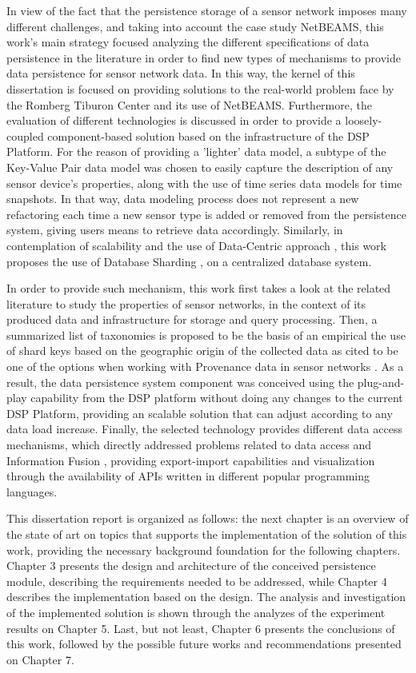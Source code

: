 In view of the fact that the persistence storage of a sensor network imposes
many different challenges, and taking into account the case study NetBEAMS, this
work's main strategy focused analyzing the different specifications of data
persistence in the literature in order to find new types of mechanisms to
provide data persistence for sensor network data. In this way, the kernel of
this dissertation is focused on providing solutions to the real-world problem
face by the Romberg Tiburon Center and its use of NetBEAMS. Furthermore,
the evaluation of different technologies is discussed in order to provide a
loosely-coupled component-based solution based on the infrastructure of the 
DSP Platform. For the reason of providing a 'lighter' data model, a subtype of
the Key-Value Pair \cite{db-kvp} data model was chosen to easily capture the
description of any sensor device's properties, along with the use of time
series data models \cite{sn-provenance} for time snapshots. In that way, data
modeling process does not represent a new refactoring each time a new sensor 
type is added or removed from the persistence system, giving users means to 
retrieve data accordingly. Similarly, in contemplation of scalability and the
use of Data-Centric approach \cite{sn-storage03}, this work proposes the use of
Database Sharding \cite{db-shard01} \cite{db-shard02}, on a centralized
database system. 

In order to provide such mechanism, this work first takes a look at the related
literature to study the properties of sensor networks, in the context of its
produced data and infrastructure for storage and query processing. Then, a
summarized list of taxonomies is proposed to be the basis of an empirical  the
use of shard keys based on the geographic origin of the collected data as cited to be one of the options when working with Provenance data in sensor networks \cite{sn-provenance}. As a result, the data persistence system component was conceived using the plug-and-play capability from the DSP platform without doing  any changes to the current DSP Platform, providing an scalable solution that can adjust according to any data load increase. Finally, the selected technology provides different data access
mechanisms, which directly addressed problems related to data access and
Information Fusion \cite{sn-info-fusion}, providing export-import capabilities
and visualization through the availability of APIs written in different
popular programming languages.

This dissertation report is organized as follows: the next chapter is an 
overview of the state of art on topics that supports the implementation of the
solution of this work, providing the necessary background foundation for the 
following chapters. Chapter 3 presents the design and architecture of the 
conceived persistence module, describing the requirements needed to be
addressed,  while Chapter 4 describes the implementation based on the design. 
The analysis and investigation of the implemented solution is shown through 
the analyzes of the experiment results on Chapter 5. Last, but not least, 
Chapter 6 presents the conclusions of this work, followed by the possible 
future works and recommendations presented on Chapter 7.